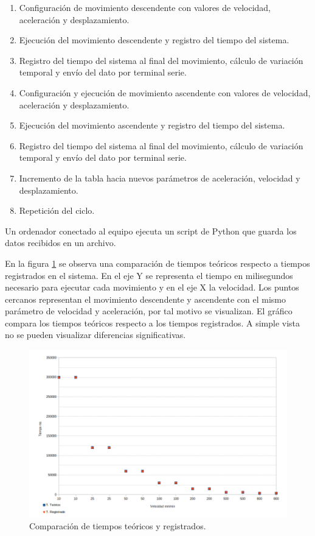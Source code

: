 \begin{enumerate}
\item Configuración de movimiento descendente con valores de velocidad, aceleración y desplazamiento.
\item Ejecución del movimiento descendente y registro del tiempo del sistema.
\item Registro del tiempo del sistema al final del movimiento, cálculo de variación temporal y envío del dato por terminal serie.
\item Configuración y ejecución de movimiento ascendente con valores de velocidad, aceleración y desplazamiento.
\item Ejecución del movimiento ascendente y registro del tiempo del sistema.
\item Registro del tiempo del sistema al final del movimiento, cálculo de variación temporal y envío del dato por terminal serie.
\item Incremento de la tabla hacia nuevos parámetros de aceleración, velocidad y desplazamiento.
\item Repetición del ciclo.
\end{enumerate}

Un ordenador conectado al equipo ejecuta un script de Python que guarda los datos recibidos en un archivo.

En la figura \ref{fig:tiempo_movimiento_1} se observa una comparación de tiempos teóricos respecto a  tiempos registrados en el sistema. En el eje Y se representa el tiempo en milisegundos necesario para ejecutar cada movimiento y en el eje X la velocidad. Los puntos cercanos representan el movimiento descendente y ascendente con el mismo parámetro de velocidad y aceleración, por tal motivo se visualizan. El gráfico compara los tiempos teóricos respecto a los tiempos registrados. A simple vista no se pueden visualizar diferencias significativas.

\begin{figure}[h!]
\centering 
\includegraphics[width=1\textwidth]{./Figures/tiempo_movimiento_1.png}
\caption{Comparación de tiempos teóricos y registrados.}
\label{fig:tiempo_movimiento_1}
\end{figure}

